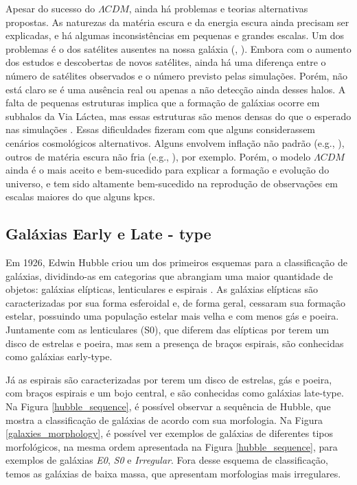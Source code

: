 Apesar do sucesso do $\Lambda CDM$, ainda há problemas e teorias alternativas propostas. As naturezas da matéria escura e da energia escura ainda precisam ser explicadas, e há algumas inconsistências em pequenas e grandes escalas. Um dos problemas é o dos satélites ausentes na nossa galáxia (\citealp{Klypin_1999}, \citealp{Moore_1999}). Embora com o aumento dos estudos e descobertas de novos satélites, ainda há uma diferença entre o número de satélites observados e o número previsto pelas simulações. Porém, não está claro se é uma ausência real ou apenas a não detecção ainda desses halos. A falta de pequenas estruturas implica que a formação de galáxias ocorre em subhalos da Via Láctea, mas essas estruturas são menos densas do que o esperado nas simulações \citep{Boylan_Kolchin_2011}. Essas dificuldades fizeram com que alguns considerassem cenários cosmológicos alternativos. Alguns envolvem inflação não padrão (e.g., \citealp{Kamionkowski_2000}), outros de matéria escura não fria (e.g., \citealp{Murgia_2017}), por exemplo. Porém, o modelo $\Lambda CDM$ ainda é o mais aceito e bem-sucedido para explicar a formação e evolução do universo, e tem sido altamente bem-sucedido na reprodução de observações em escalas maiores do que alguns kpcs.

\subsection{Galáxias Early e Late - type}\label{subsec:Galaxia_early_late}
Em 1926, Edwin Hubble criou um dos primeiros esquemas para a classificação de galáxias, dividindo-as em categorias que abrangiam uma maior quantidade de objetos: galáxias elípticas, lenticulares e espirais \citep{hubble_classification_1926}. As galáxias elípticas são caracterizadas por sua forma esferoidal e, de forma geral, cessaram sua formação estelar, possuindo uma população estelar mais velha e com menos gás e poeira. Juntamente com as lenticulares (S0), que diferem das elípticas por terem um disco de estrelas e poeira, mas sem a presença de braços espirais, são conhecidas como galáxias early-type.

Já as espirais são caracterizadas por terem um disco de estrelas, gás e poeira, com braços espirais e um bojo central, e são conhecidas como galáxias late-type. Na Figura \ref{hubble_sequence}, é possível observar a sequência de Hubble, que mostra a classificação de galáxias de acordo com sua morfologia. Na Figura \ref{galaxies_morphology}, é possível ver exemplos de galáxias de diferentes tipos morfológicos, na mesma ordem apresentada na Figura \ref{hubble_sequence}, para exemplos de galáxias \textit{E0}, \textit{S0} e \textit{Irregular}. Fora desse esquema de classificação, temos as galáxias de baixa massa, que apresentam morfologias mais irregulares.

